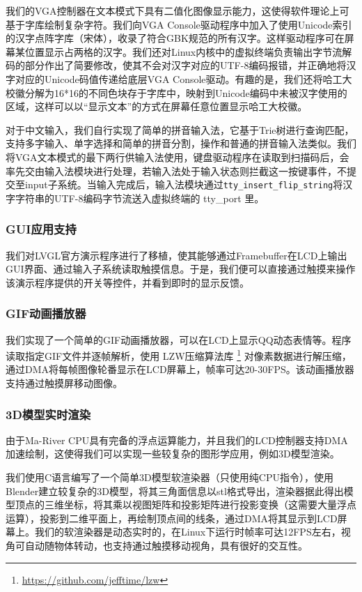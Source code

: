 我们的VGA控制器在文本模式下具有二值化图像显示能力，这使得软件理论上可基于字库绘制复杂字符。我们向VGA Console驱动程序中加入了使用Unicode索引的汉字点阵字库（宋体），收录了符合GBK规范的所有汉字。这样驱动程序可在屏幕某位置显示占两格的汉字。我们还对Linux内核中的虚拟终端负责输出字节流解码的部分作出了简要修改，使其不会对汉字对应的UTF-8编码报错，并正确地将汉字对应的Unicode码值传递给底层VGA Console驱动。有趣的是，我们还将哈工大校徽分解为16*16的不同色块存于字库中，映射到Unicode编码中未被汉字使用的区域，这样可以以“显示文本”的方式在屏幕任意位置显示哈工大校徽。
    
对于中文输入，我们自行实现了简单的拼音输入法，它基于Trie树进行查询匹配，支持多字输入、单字选择和简单的拼音分割，操作和普通的拼音输入法类似。我们将VGA文本模式的最下两行供输入法使用，键盘驱动程序在读取到扫描码后，会率先交由输入法模块进行处理，若输入法处于输入状态则拦截这一按键事件，不提交至input子系统。当输入完成后，输入法模块通过\texttt{tty\_insert\_flip\_string}将汉字字符串的UTF-8编码字节流送入虚拟终端的 tty\_port 里。

\subsubsection{GUI应用支持}
我们对LVGL官方演示程序进行了移植，使其能够通过Framebuffer在LCD上输出GUI界面、通过输入子系统读取触摸信息。于是，我们便可以直接通过触摸来操作该演示程序提供的开关等控件，并看到即时的显示反馈。

\subsubsection{GIF动画播放器} 我们实现了一个简单的GIF动画播放器，可以在LCD上显示QQ动态表情等。程序读取指定GIF文件并逐帧解析，使用 LZW压缩算法库 \footnote{\url{https://github.com/jefftime/lzw}} 对像素数据进行解压缩，通过DMA将每帧图像轮番显示在LCD屏幕上，帧率可达20-30FPS。该动画播放器支持通过触摸屏移动图像。
\subsubsection{3D模型实时渲染} 
由于Ma-River CPU具有完备的浮点运算能力，并且我们的LCD控制器支持DMA加速绘制，这使得我们可以实现一些较复杂的图形学应用，例如3D模型渲染。

我们使用C语言编写了一个简单3D模型软渲染器（只使用纯CPU指令），使用Blender建立较复杂的3D模型，将其三角面信息以stl格式导出，渲染器据此得出模型顶点的三维坐标，将其乘以视图矩阵和投影矩阵进行投影变换（这需要大量浮点运算），投影到二维平面上，再绘制顶点间的线条，通过DMA将其显示到LCD屏幕上。我们的软渲染器是动态实时的，在Linux下运行时帧率可达12FPS左右，视角可自动随物体转动，也支持通过触摸移动视角，具有很好的交互性。